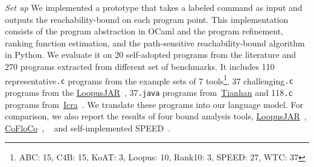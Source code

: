 \emph{Set up} We implemented a prototype {\THESYSTEM} that takes a labeled command as input 
and outputs the reachability-bound on each program point.
This implementation consists of the 
program abstraction in OCaml and the program refinement, ranking function estimation, and the path-sensitive reachability-bound algorithm in Python.
We evaluate it on 20 self-adopted programs from the literature and 270 programs extracted from different set of benchmarks. 
It includes 110 representative{\tt .c} programs from the example sets of 7 tools\footnote{ABC: 15, C4B: 15, KoAT: 3, Loopus: 10, Rank10: 3, SPEED: 27, WTC: 37}, 37 challenging{\tt .c} programs 
from the \hyperlink{https://forsyte.at/static/people/sinn/loopusJAR/index.html}{LoopusJAR}~\cite{BenchmarkLoops,SinnZV17},
37{\tt .java} programs from~\hyperlink{https://zenodo.org/record/5140586\#.Y5pBoC-B1QI}{Tianhan}\cite{BenchmarkTianhan,LuCT21}
and 118{\tt .c} programs from~\hyperlink{https://github.com/icra-team/icra}{Icra}~\cite{BenchmarkIcra,KincaidBCR19,CyphertBKR19}.
We translate these programs into our language model.
For comparison, we also report the results of four bound analysis tools, 
\hyperlink{https://forsyte.at/software/loopus/}{LoopusJAR}~\cite{SinnZV17},
\hyperlink{https://github.com/aeflores/CoFloCo/tree/master/src}{CoFloCo}~\cite{ToolCofloco,Montoya17,Flores-Montoya16,Flores-MontoyaH14},
~\cite{BenchmarkTianhan}
and self-implemented SPEED~\cite{GulwaniJK09}.

